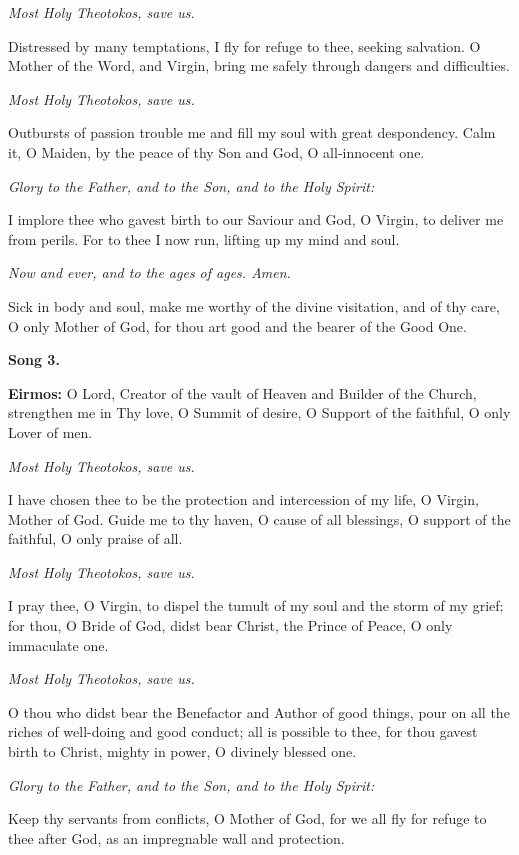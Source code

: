 \emph{Most Holy Theotokos, save us.}

Distressed by many temptations, I fly for refuge to thee, seeking salvation. 
O Mother of the Word, and Virgin, bring me safely through dangers and difficulties.

\emph{Most Holy Theotokos, save us.}

Outbursts of passion trouble me and fill my soul with great despondency.
Calm it, O Maiden, by the peace of thy Son and God, O all-innocent one.

\emph{Glory to the Father, and to the Son, and to the Holy Spirit:}

I implore thee who gavest birth to our Saviour and God, O Virgin, to deliver me from perils. 
For to thee I now run, lifting up my mind and soul.

\emph{Now and ever, and to the ages of ages. Amen.}

Sick in body and soul, make me worthy of the divine visitation, and of thy care, O only Mother of God, for thou art good and the bearer of the Good One.

\textbf{Song 3.}

\textbf{Eirmos:} O Lord, Creator of the vault of Heaven and Builder of the Church, strengthen me in Thy love, O Summit of desire, O Support of the faithful, O only Lover of men.

\emph{Most Holy Theotokos, save us.}

I have chosen thee to be the protection and intercession of my life, O Virgin, Mother of God. Guide me to thy haven, O cause of all blessings, O support of the faithful, O only praise of all.

\emph{Most Holy Theotokos, save us.}

I pray thee, O Virgin, to dispel the tumult of my soul and the storm of my grief; 
for thou, O Bride of God, didst bear Christ, the Prince of Peace, O only immaculate one.

\emph{Most Holy Theotokos, save us.}

O thou who didst bear the Benefactor and Author of good things, pour on all the riches of well-doing and good conduct; 
all is possible to thee, for thou gavest birth to Christ, mighty in power, O divinely blessed one.

\emph{Glory to the Father, and to the Son, and to the Holy Spirit:}

Keep thy servants from conflicts, O Mother of God, for we all fly for refuge to thee after God, as an impregnable wall and protection.

